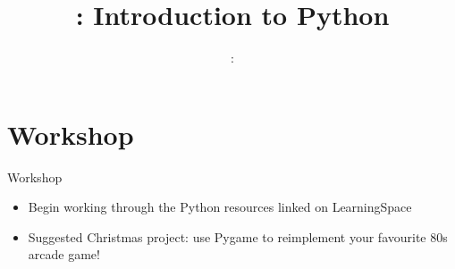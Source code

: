 \usepackage{../../beamerthemeFalmouthGamesAcademy}
\usepackage{multimedia}
\graphicspath{ {../../} }

\lstset{language=Python
}

\usepackage[normalem]{ulem}
\usepackage{wasysym}

\usepackage{pdfpages}
\usepackage{algpseudocode}

\usetikzlibrary{arrows,automata}



\hypersetup{
pdftex,
pdftitle=\sessionnumber: Introduction to Python,
pdfauthor=Ed Powley,
pdfdisplaydoctitle,
pdflang=en-GB
}


\title{\sessionnumber: Introduction to Python}
\subtitle{\modulecode: \moduletitle}

\frame{\titlepage} 





\part{Workshop}
\frame{\partpage}

\begin{frame}{Workshop}
    \begin{itemize}
        \item Begin working through the Python resources linked on LearningSpace
        \item Suggested Christmas project: use Pygame to reimplement your favourite 80s arcade game!
    \end{itemize}
\end{frame}


